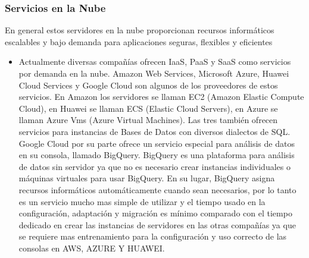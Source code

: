 \documentclass[12pt,a4paper,openright]{article}
\begin{document}
\subsubsection{Servicios en la Nube}
En general estos servidores en la nube proporcionan recursos informáticos escalables y bajo demanda para aplicaciones seguras, flexibles y eficientes

\begin{itemize}
    \item Actualmente diversas compañías ofrecen IaaS, PaaS y SaaS como servicios por demanda en la nube. Amazon Web Services, Microsoft Azure, Huawei Cloud Services y Google Cloud son algunos de los proveedores de estos servicios. En Amazon los servidores se llaman EC2 (Amazon Elastic Compute Cloud), en Huawei se llaman ECS (Elastic Cloud Servers), en Azure se llaman Azure Vms (Azure Virtual Machines). Las tres también ofrecen servicios para instancias de Bases de Datos con diversos dialectos de SQL. Google Cloud por su parte ofrece un servicio especial para análisis de datos en su consola, llamado BigQuery. BigQuery es una plataforma para análisis de datos sin servidor ya que no es necesario crear instancias individuales o máquinas virtuales para usar BigQuery. En su lugar, BigQuery asigna recursos informáticos automáticamente cuando sean necesarios, por lo tanto es un servicio mucho mas simple de utilizar y el tiempo usado en la configuración, adaptación y migración es mínimo comparado con el tiempo dedicado en crear las instancias de servidores en las otras compañías ya que se requiere mas entrenamiento para la configuración y uso correcto de las consolas en AWS, AZURE Y HUAWEI.
\end{itemize}
\end{document}
